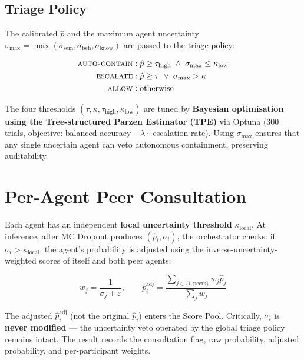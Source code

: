 \documentclass[12pt,a4paper]{article}
\begin{document}
\subsection{Triage Policy}

The calibrated $\hat{p}$ and the maximum agent uncertainty
$\sigma_{\max} = \max(\sigma_{\text{sem}}, \sigma_{\text{beh}}, \sigma_{\text{know}})$
are passed to the triage policy:

\begin{tcolorbox}[keybox, title=Policy Rules]
\small
\begin{align*}
  \textsc{auto-contain} &: \hat{p} \geq \tau_{\text{high}} \;\wedge\; \sigma_{\max} \leq \kappa_{\text{low}} \\
  \textsc{escalate}     &: \hat{p} \geq \tau \;\vee\; \sigma_{\max} > \kappa \\
  \textsc{allow}        &: \text{otherwise}
\end{align*}
\end{tcolorbox}

The four thresholds $(\tau, \kappa, \tau_{\text{high}}, \kappa_{\text{low}})$ are
tuned by \textbf{Bayesian optimisation using the Tree-structured Parzen Estimator (TPE)}
via Optuna (300 trials, objective: balanced accuracy $- \lambda \cdot$ escalation rate).
Using $\sigma_{\max}$ ensures that any single uncertain agent can veto autonomous
containment, preserving auditability.

\section{Per-Agent Peer Consultation}
\label{sec:consult}

Each agent has an independent \textbf{local uncertainty threshold} $\kappa_{\text{local}}$.
At inference, after MC Dropout produces $(\hat{p}_i, \sigma_i)$, the orchestrator checks:
if $\sigma_i > \kappa_{\text{local}}$, the agent's probability is adjusted using the
inverse-uncertainty-weighted scores of itself and both peer agents:

\begin{equation}
  w_j = \frac{1}{\sigma_j + \varepsilon}, \qquad
  \hat{p}_i^{\text{adj}} = \frac{\sum_{j \in \{i, \text{peers}\}} w_j \hat{p}_j}
                                 {\sum_{j} w_j}
  \label{eq:consult}
\end{equation}

The adjusted $\hat{p}_i^{\text{adj}}$ (not the original $\hat{p}_i$) enters the Score
Pool. Critically, $\sigma_i$ is \textbf{never modified} — the uncertainty veto operated
by the global triage policy remains intact. The result records the consultation flag,
raw probability, adjusted probability, and per-participant weights.
\end{document}
